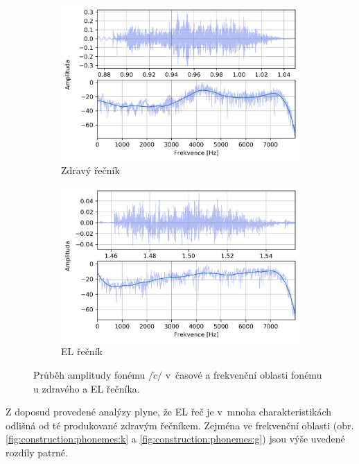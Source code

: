 \begin{figure}[htpb]
  \centering
  \begin{subfigure}[b]{0.45\textwidth}
    \includegraphics[width=\textwidth]{./ch5-construction/img/signal-normal_c.png}
    \caption{Zdravý řečník}
    \label{fig:construction:phonemes:c:normal}
  \end{subfigure}
  \begin{subfigure}[b]{0.45\textwidth}
    \includegraphics[width=\textwidth]{./ch5-construction/img/signal-el_c.png}
    \caption{EL řečník}
    \label{fig:construction:phonemes:c:el}
  \end{subfigure}
  \caption[Průběh amplitudy fonému $/\check{c}/$ zdravého a EL řečníka.]{Průběh amplitudy fonému $/\check{c}/$ v~časové a frekvenční oblasti fonému u zdravého a EL řečníka.}
  \label{fig:construction:phonemes:c}
\end{figure}

Z doposud provedené analýzy plyne, že EL řeč je v~mnoha charakteristikách odlišná od té produkované zdravým řečníkem.
Zejména ve frekvenční oblasti (obr. \ref{fig:construction:phonemes:k} a \ref{fig:construction:phonemes:g}) jsou výše uvedené rozdíly patrné.

